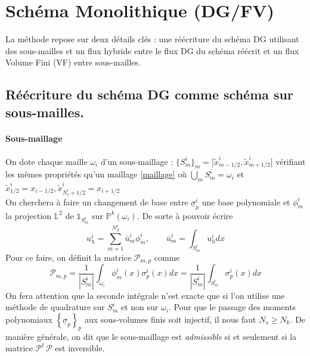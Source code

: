 
\section{Schéma Monolithique (DG/FV)}
La méthode repose sur deux détails clés : une réécriture du schéma DG utilisant des sous-mailles et 
un flux hybride entre le flux DG du schéma réécrit et un flux Volume Fini (VF) entre sous-mailles.
\subsection{Réécriture du schéma DG comme schéma sur sous-mailles.}
\paragraph{Sous-maillage \\}

On dote chaque maille $\omega_i$ d'un sous-maillage : $\{S_m^i\}_m = ]\tilde{x}^i_{m-1/2}, \tilde{x}^i_{m+1/2}[$ 
vérifiant les mêmes propriétés qu'un maillage \eqref{maillage} où $\bigcup_m S_m^i = \omega_i$ et 
$\tilde{x}_{1/2}^i = x_{i-1/2},\tilde{x}_{N_s^i + 1/2}^i = x_{i+1/2} $\\
On cherchera à faire un changement de base entre $\underline{\sigma}_p^i$ une base polynomiale 
et $\phi_m^i$ la projection $\mathbb{L}^2$ de $\mathbb{1}_{S_m^i}$ sur $\mathbb{P}^k(\omega_i)$.
De sorte à pouvoir écrire 
\begin{equation}
    u_h^i = \sum_{m=1}^{N_S^i}\overline{u}_m^i \phi_m^i,\qquad \overline{u}_m^i = \int_{S^i_m} u_h^i dx
\end{equation}
Pour ce faire, on définit la matrice $\mathcal{P}_{m,p}$ comme 
\begin{equation}
    \mathcal{P}_{m,p} =  \frac{1}{|S_m^i|} \int_{\omega_i} \phi_m^i(x) \sigma_p^i(x) dx = \frac{1}{|S_m^i|}  \int_{S_m^i} \sigma_p^i(x) dx
\end{equation}
On fera attention que la seconde intégrale n'est exacte que si l'on utilise une méthode de quadrature sur $S_m^i$ et non sur $\omega_i$.
Pour que le passage des moments polynomiaux $\left\{ \underline{\sigma}_p \right\}_p$ aux sous-volumes finis soit injectif, il nous faut $N_s \geq N_k$. 
De manière générale, on dit que le sous-maillage est \textit{admissible} si et seulement si la matrice $\mathcal{P}^t\,\mathcal{P}$ est inversible.

